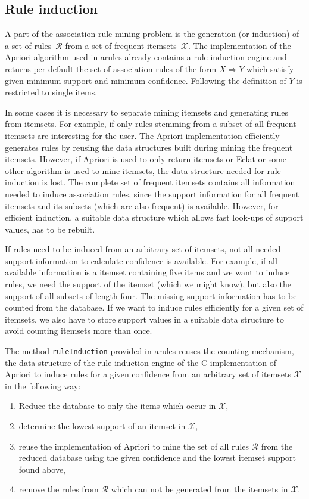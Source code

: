 \documentclass[10pt,a4paper]{article}
\newcommand{\strong}[1]{{\normalfont\fontseries{b}\selectfont #1}}
\newcommand{\code}[1]{\texttt{#1}}
\newcommand{\pkg}[1]{\strong{#1}}
\newcommand{\proglang}[1]{\textsf{#1}}
\newcommand{\set}[1]{\mathcal{#1}}
\begin{document}
\subsection{Rule induction\label{sec:induction}}
A part of the association rule mining problem is the generation (or induction)
of a set of rules~$\set{R}$ from a set of frequent itemsets~$\set{X}$. 
The implementation of the
Apriori algorithm used in \pkg{arules} already contains a rule induction engine
and returns per default the set of association rules 
of the form $X \Rightarrow Y$ which satisfy given minimum support and
minimum confidence.
Following the definition of \cite{arules:Agrawal+Imielinski+Swami:1993} 
$Y$ is restricted to single items. 

In some cases it is necessary to separate mining itemsets and 
generating rules from itemsets. For example, if only rules stemming 
from a subset of all frequent itemsets are interesting for the user.
The Apriori implementation efficiently generates rules by 
reusing the data structures built during mining the frequent itemsets.
However, if Apriori is used to only return itemsets or Eclat or
some other algorithm is used to mine itemsets, 
the data structure needed for rule induction is lost.
The complete set of frequent itemsets contains all information needed to
induce association rules, since the support information for all
frequent itemsets and its subsets (which are also frequent) is available.
However, for efficient induction, a suitable data structure which allows fast 
look-ups of support values, has to be rebuilt. 

If rules need to be induced from an arbitrary set of itemsets, 
not all needed support information to calculate
confidence is available.
For example, if all available information is 
a itemset containing  five items and we want to induce rules,
we need the support of the itemset (which we might know), but 
also the support of
all subsets of length four.
The missing support information has to be counted from the 
database. If we want to induce rules efficiently for 
a given set of itemsets, we also have to store support values in
a suitable data structure to avoid counting itemsets more than once.

The method \code{ruleInduction} provided in \pkg{arules}
reuses the 
counting mechanism, the data structure of the 
rule induction engine of the 
\proglang{C} implementation of Apriori to induce
rules for a given confidence from an arbitrary
set of itemsets $\set{X}$ in 
the following way:
\begin{enumerate}
\item Reduce the database to only the items which occur in $\set{X}$,
\item determine the lowest support of an itemset in $\set{X}$,
\item reuse the implementation of Apriori to
    mine the set of all rules $\set{R}$ from the reduced database 
    using the given confidence 
    and the lowest itemset support found above,
\item remove the rules from $\set{R}$ which can not be generated from the 
    itemsets in $\set{X}$.
\end{enumerate}
\end{document}
